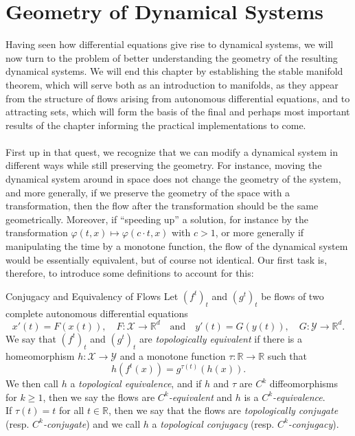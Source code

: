 \documentclass[11pt, a4paper]{memoir}
\theoremstyle{break}
\theoremstyle{break}
\theoremstyle{nonumberplain}
\newcommand{\mR}{\mathbb{R}}
\begin{document}
\section{Geometry of Dynamical Systems}
Having seen how differential equations give rise to dynamical systems, we will now turn to the problem of better understanding the geometry of the resulting dynamical systems. We will end this chapter by establishing the stable manifold theorem, which will serve both as an introduction to manifolds, as they appear from the structure of flows arising from autonomous differential equations, and to attracting sets, which will form the basis of the final and perhaps most important results of the chapter informing the practical implementations to come.\\\\
First up in that quest, we recognize that we can modify a dynamical system in different ways while still preserving the geometry. For instance, moving the dynamical system around in space does not change the geometry of the system, and more generally, if we preserve the geometry of the space with a transformation, then the flow after the transformation should be the same geometrically. Moreover, if \enquote{speeding up} a solution, for instance by the transformation $\varphi(t,x)\mapsto\varphi(c\cdot t,x)$ with $c>1$, or more generally if manipulating the time by a monotone function, the flow of the dynamical system would be essentially equivalent, but of course not identical. Our first task is, therefore, to introduce some definitions to account for this:
\begin{mydefinition}{Conjugacy and Equivalency of Flows}
Let $(f^t)_t$ and $(g^t)_t$ be flows of two complete autonomous differential equations
$$x'(t)=F(x(t)), \quad F:\mathcal{X}\to\mR^d\quad\text{and}\quad y'(t)=G(y(t)),\quad G:\mathcal{Y}\to\mR^d.$$
We say that $(f^t)_t$ and $(g^t)_t$ are \emph{topologically equivalent} if there is a homeomorphism $h:\mathcal{X}\to\mathcal{Y}$ and a monotone function $\tau:\mR\to\mR$ such that
$$h(f^t(x))=g^{\tau(t)}(h(x)).$$
We then call $h$ a \emph{topological equivalence}, and if $h$ and $\tau$ are $C^k$ diffeomorphisms for $k\geqslant 1$, then we say the flows are \emph{$C^k$-equivalent} and $h$ is a \emph{$C^k$-equivalence}.\\[5pt]
If $\tau(t)=t$ for all $t\in \mR$, then we say that the flows are \emph{topologically conjugate} (resp. \emph{$C^k$-conjugate}) and we call $h$ a \emph{topological conjugacy} (resp. \emph{$C^k$-conjugacy}).
\end{mydefinition}
\end{document}
